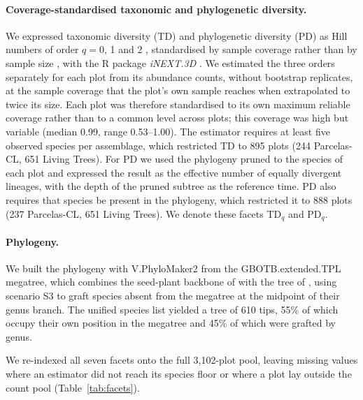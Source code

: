 \documentclass[preprint,12pt]{elsarticle}
\begin{document}
\paragraph{Coverage-standardised taxonomic and phylogenetic diversity.}
We expressed taxonomic diversity (TD) and phylogenetic diversity (PD) as Hill numbers of
order $q = 0$, 1 and 2 \citep{hill1973diversity,chao2014unifying}, standardised by sample
coverage rather than by sample size \citep{chao2012coverage,chao2014rarefaction}, with the
R package \emph{iNEXT.3D} \citep{chao2021measuring}. We estimated the three orders
separately for each plot from its abundance counts, without bootstrap replicates, at the
sample coverage that the plot's own sample reaches when extrapolated to twice its size.
Each plot was therefore standardised to its own maximum reliable coverage rather than to a
common level across plots; this coverage was high but variable (median 0.99, range
0.53--1.00). The estimator requires at least five observed species per assemblage, which
restricted TD to 895 plots (244 Parcelas-CL, 651 Living Trees). For PD we used the
phylogeny pruned to the species of each plot and expressed the result as the effective
number of equally divergent lineages, with the depth of the pruned subtree as the
reference time. PD also requires that species be
present in the phylogeny, which restricted it to 888 plots (237 Parcelas-CL, 651 Living
Trees). We denote these facets TD$_q$ and PD$_q$.

\paragraph{Phylogeny.}
We built the phylogeny with V.PhyloMaker2 \citep{jinqian2022vphylomaker2} from the
GBOTB.extended.TPL megatree, which combines the seed-plant backbone of
\citet{smithbrown2018constructing} with the tree of \citet{zanne2014three}, using scenario
S3 to graft species absent from the megatree at the midpoint of their genus branch. The
unified species list yielded a tree of 610 tips, 55\% of which occupy their own position in
the megatree and 45\% of which were grafted by genus.

We re-indexed all seven facets onto the full 3,102-plot pool, leaving missing values where
an estimator did not reach its species floor or where a plot lay outside the count pool
(Table~\ref{tab:facets}).
\end{document}
